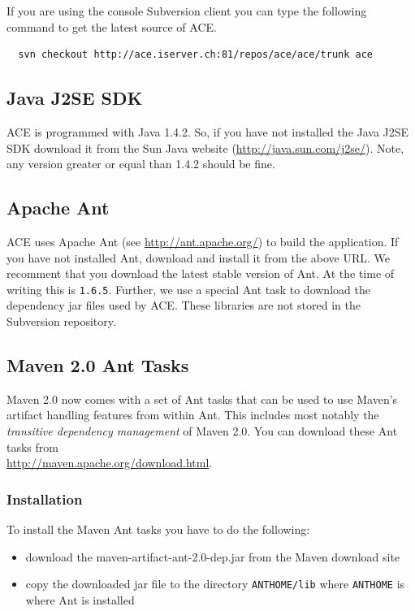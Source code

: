\documentclass[11pt,a4paper]{article}
\begin{document}
If you are using the console Subversion client you can type the following command to get the latest source of ACE.

\small{\begin{verbatim}
  svn checkout http://ace.iserver.ch:81/repos/ace/ace/trunk ace
\end{verbatim}}


\subsection{Java J2SE SDK}
ACE is programmed with Java 1.4.2. So, if you have not installed the
Java J2SE SDK download it from the Sun Java website 
(\href{http://java.sun.com/j2se/}{http://java.sun.com/j2se/}). Note,
any version greater or equal than 1.4.2 should be fine.


\subsection{Apache Ant}
ACE uses Apache Ant (see \href{http://ant.apache.org/}{http://ant.apache.org/})
to build the application. If you have not installed Ant, download and install
it from the above URL. We recomment that you download the latest stable
version of Ant. At the time of writing this is \texttt{1.6.5}.
Further, we use a special Ant task to download the
dependency jar files used by ACE. 
These libraries are not stored in the Subversion repository.


\subsection{Maven 2.0 Ant Tasks}
Maven 2.0 now comes with a set of Ant tasks that can be used to use Maven's
artifact handling features from within Ant. This includes most notably the
\emph{transitive dependency management} of Maven 2.0. You can
download these Ant tasks from \\
\href{http://maven.apache.org/download.html}{http://maven.apache.org/download.html}.

\subsubsection{Installation}
To install the Maven Ant tasks you have to do the following:
\begin{itemize}
 \item download the maven-artifact-ant-2.0-dep.jar from the Maven download site
 \item copy the downloaded jar file to the directory \texttt{ANTHOME/lib} where \texttt{ANTHOME} is where Ant is installed
\end{itemize}
\end{document}
